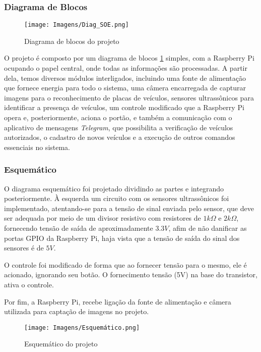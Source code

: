 \documentclass[conference]{IEEEtran}
\begin{document}
\subsubsection{Diagrama de Blocos}

\begin{figure}[!h]
    \centering
    \texttt{[image: Imagens/Diag\_SOE.png]}
    \caption{Diagrama de blocos do projeto}
    \label{fig:diagBlocos}
\end{figure}

O projeto é composto por um diagrama de blocos \ref{fig:diagBlocos} simples, com a Raspberry Pi ocupando o papel central, onde todas as informações são processadas. A partir dela, temos diversos módulos interligados, incluindo uma fonte de alimentação que fornece energia para todo o sistema, uma câmera encarregada de capturar imagens para o reconhecimento de placas de veículos, sensores ultrassônicos para identificar a presença de veículos, um controle modificado que a Raspberry Pi opera e, posteriormente, aciona o portão, e também a comunicação com o aplicativo de mensagens \textit{Telegram}, que possibilita a verificação de veículos autorizados, o cadastro de novos veículos e a execução de outros comandos essenciais no sistema.\\

\subsubsection{Esquemático}

O diagrama esquemático foi projetado dividindo as partes e integrando posteriormente. À esquerda um circuito com os sensores ultrassônicos foi implementado, atentando-se para a tensão de sinal enviada pelo sensor, que deve ser adequada por meio de um divisor resistivo com resistores de $1k\Omega$ e $2k\Omega$, fornecendo tensão de saída de aproximadamente $3.3V$, afim de não danificar as portas GPIO da Raspberry Pi, haja vista que a tensão de saída do sinal dos sensores é de $5V$.

O controle foi modificado de forma que ao fornecer tensão para o mesmo, ele é acionado, ignorando seu botão. O fornecimento tensão (5V) na base do transistor, ativa o controle. 

Por fim, a Raspberry Pi, recebe ligação da fonte de alimentação e câmera utilizada para captação de imagens no projeto. 

\begin{figure}[h]
    \centering
    \texttt{[image: Imagens/Esquemático.png]}
    \caption{Esquemático do projeto}
    \label{fig:esquema}
\end{figure}
\end{document}
